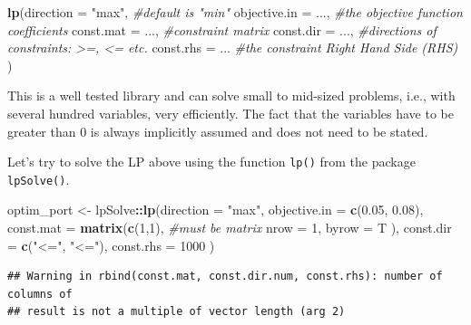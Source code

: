 \documentclass[11pt,]{article}
\newenvironment{Shaded}{\begin{snugshade}}{\end{snugshade}}
\newcommand{\KeywordTok}[1]{\textcolor[rgb]{0.13,0.29,0.53}{\textbf{#1}}}
\newcommand{\DataTypeTok}[1]{\textcolor[rgb]{0.13,0.29,0.53}{#1}}
\newcommand{\DecValTok}[1]{\textcolor[rgb]{0.00,0.00,0.81}{#1}}
\newcommand{\FloatTok}[1]{\textcolor[rgb]{0.00,0.00,0.81}{#1}}
\newcommand{\StringTok}[1]{\textcolor[rgb]{0.31,0.60,0.02}{#1}}
\newcommand{\CommentTok}[1]{\textcolor[rgb]{0.56,0.35,0.01}{\textit{#1}}}
\newcommand{\OperatorTok}[1]{\textcolor[rgb]{0.81,0.36,0.00}{\textbf{#1}}}
\newcommand{\NormalTok}[1]{#1}
\begin{document}
\begin{Shaded}
\begin{Highlighting}[]
\KeywordTok{lp}\NormalTok{(}\DataTypeTok{direction =} \StringTok{"max"}\NormalTok{, }\CommentTok{#default is "min"}
   \DataTypeTok{objective.in =}\NormalTok{ ..., }\CommentTok{#the objective function coefficients}
   \DataTypeTok{const.mat =}\NormalTok{ ..., }\CommentTok{#constraint matrix }
   \DataTypeTok{const.dir =}\NormalTok{ ..., }\CommentTok{#directions of constraints: >=, <= etc.}
   \DataTypeTok{const.rhs =}\NormalTok{ ...  }\CommentTok{#the constraint Right Hand Side (RHS)}
\NormalTok{   ) }
\end{Highlighting}
\end{Shaded}

This is a well tested library and can solve small to mid-sized problems,
i.e., with several hundred variables, very efficiently. The fact that
the variables have to be greater than 0 is always implicitly assumed and
does not need to be stated.

Let's try to solve the LP above using the function \texttt{lp()} from
the package \texttt{lpSolve()}.

\begin{Shaded}
\begin{Highlighting}[]
\NormalTok{optim_port <-}\StringTok{ }\NormalTok{lpSolve}\OperatorTok{::}\KeywordTok{lp}\NormalTok{(}\DataTypeTok{direction =} \StringTok{"max"}\NormalTok{,}
                          \DataTypeTok{objective.in =} \KeywordTok{c}\NormalTok{(}\FloatTok{0.05}\NormalTok{, }\FloatTok{0.08}\NormalTok{),}
                          \DataTypeTok{const.mat =} \KeywordTok{matrix}\NormalTok{(}\KeywordTok{c}\NormalTok{(}\DecValTok{1}\NormalTok{,}\DecValTok{1}\NormalTok{), }\CommentTok{#must be matrix}
                                             \DataTypeTok{nrow =} \DecValTok{1}\NormalTok{,}
                                             \DataTypeTok{byrow =}\NormalTok{ T}
\NormalTok{                                             ),}
                          \DataTypeTok{const.dir =} \KeywordTok{c}\NormalTok{(}\StringTok{"<="}\NormalTok{, }\StringTok{"<="}\NormalTok{),}
                          \DataTypeTok{const.rhs =} \DecValTok{1000}
\NormalTok{                          )}
\end{Highlighting}
\end{Shaded}

\begin{verbatim}
## Warning in rbind(const.mat, const.dir.num, const.rhs): number of columns of
## result is not a multiple of vector length (arg 2)
\end{verbatim}
\end{document}
